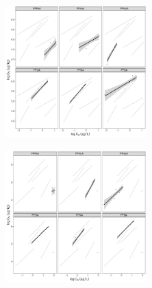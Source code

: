 \begin{figure}
    \centering
        \begin{subfigure}[]{\linewidth}
            \centering
            \includegraphics[width=0.6\textwidth]{R/figs/ULS_facet_isotherm.pdf}
            \label{fig:ULS_isotherm}
        \end{subfigure}
        \begin{subfigure}[]{\linewidth}
            \centering
            \includegraphics[width=0.6\textwidth]{R/figs/DSL_facet_isotherm.pdf}
            \label{fig:DSL_isotherm}
        \end{subfigure}   
\end{figure}
